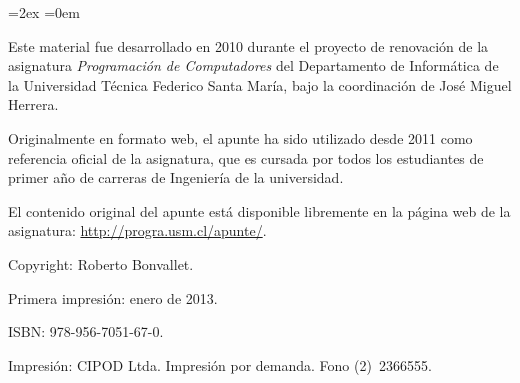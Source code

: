 \thispagestyle{empty}
\begin{minipage}[B]{\textwidth}
  \footnotesize
  \parskip=2ex
  \parindent=0em

  \vspace{100ex}

  Este material fue desarrollado en 2010
  durante el proyecto de renovación de la asignatura
  \emph{Programación de Computadores}
  del Departamento de Informática
  de la Universidad Técnica Federico Santa María,
  bajo la coordinación de José Miguel Herrera.

  Originalmente en formato web,
  el apunte ha sido utilizado desde 2011
  como referencia oficial de la asignatura,
  que es cursada por todos los estudiantes de primer año
  de carreras de Ingeniería de la universidad.

  El contenido original del apunte está disponible libremente
  en la página web de la asignatura:
  \url{http://progra.usm.cl/apunte/}.

  Copyright:  Roberto Bonvallet.

  Primera impresión: enero de 2013.

  ISBN: 978-956-7051-67-0.

  Impresión: CIPOD Ltda. Impresión por demanda. Fono (2)~2366555.
\end{minipage}


